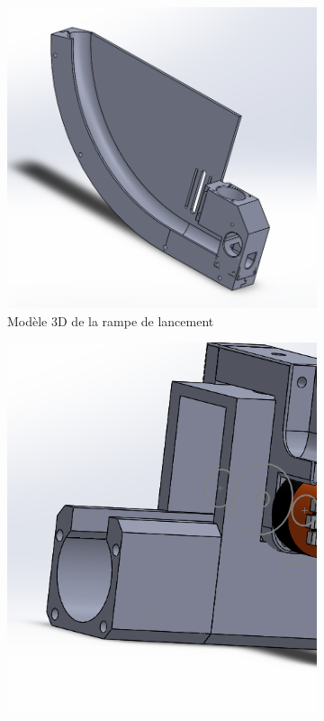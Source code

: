 \begin{figure}[h!]
    \centering

    \begin{subfigure}{0.3\linewidth}
        \centering
        \includegraphics[width=\linewidth]{img/s2/cad/rampe}
        \caption{Modèle 3D de la rampe de lancement}
        \label{fig:s2-cad-rampe}
    \end{subfigure}
    \begin{subfigure}{0.3\linewidth}
        \centering
        \includegraphics[width=\linewidth]{img/s2/cad/cannon}

\end{subfigure}
\end{figure}
